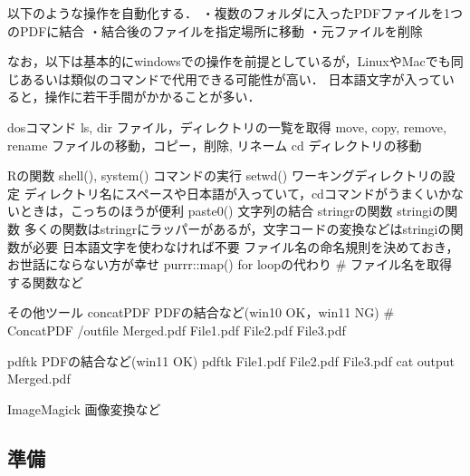 \documentclass[
]{article}
\begin{document}
以下のような操作を自動化する．
・複数のフォルダに入ったPDFファイルを1つのPDFに結合
・結合後のファイルを指定場所に移動
・元ファイルを削除

なお，以下は基本的にwindowsでの操作を前提としているが，LinuxやMacでも同じあるいは類似のコマンドで代用できる可能性が高い．
日本語文字が入っていると，操作に若干手間がかかることが多い．

dosコマンド
ls, dir
ファイル，ディレクトリの一覧を取得
move, copy, remove, rename
ファイルの移動，コピー，削除, リネーム
cd
ディレクトリの移動

Rの関数
shell(), system()
コマンドの実行
setwd()
ワーキングディレクトリの設定
ディレクトリ名にスペースや日本語が入っていて，cdコマンドがうまくいかないときは，こっちのほうが便利
paste0()
文字列の結合
stringrの関数
stringiの関数
多くの関数はstringrにラッパーがあるが，文字コードの変換などはstringiの関数が必要
日本語文字を使わなければ不要
ファイル名の命名規則を決めておき，お世話にならない方が幸せ
purrr::map()
for loopの代わり
\# ファイル名を取得する関数など

その他ツール
concatPDF
PDFの結合など(win10 OK，win11 NG)
\# ConcatPDF /outfile Merged.pdf File1.pdf File2.pdf File3.pdf

pdftk
PDFの結合など(win11 OK)
pdftk File1.pdf File2.pdf File3.pdf cat output Merged.pdf

ImageMagick
画像変換など

\hypertarget{ux6e96ux5099-2}{%
\subsection{準備}\label{ux6e96ux5099-2}}
\end{document}
